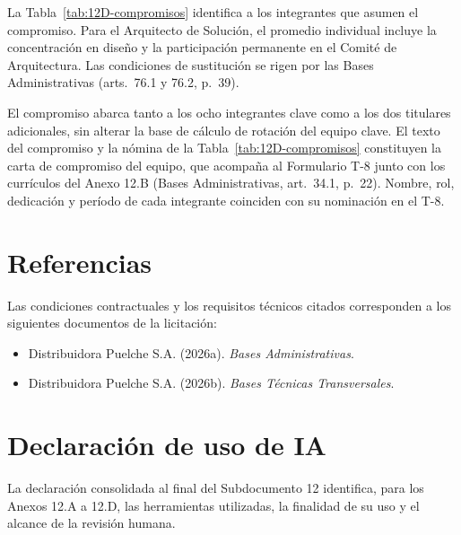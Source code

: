 La Tabla~\ref{tab:12D-compromisos} identifica a los integrantes que asumen el compromiso. Para el Arquitecto de Solución, el promedio individual incluye la concentración en diseño y la participación permanente en el Comité de Arquitectura. Las condiciones de sustitución se rigen por las Bases Administrativas (arts.~76.1 y 76.2, p.~39).


El compromiso abarca tanto a los ocho integrantes clave como a los dos titulares adicionales, sin alterar la base de cálculo de rotación del equipo clave. El texto del compromiso y la nómina de la Tabla~\ref{tab:12D-compromisos} constituyen la carta de compromiso del equipo, que acompaña al Formulario T-8 junto con los currículos del Anexo 12.B (Bases Administrativas, art.~34.1, p.~22). Nombre, rol, dedicación y período de cada integrante coinciden con su nominación en el T-8.

\section*{Referencias}
{}

Las condiciones contractuales y los requisitos técnicos citados corresponden a los siguientes documentos de la licitación:

\begin{itemize}
\item Distribuidora Puelche S.A. (2026a). \emph{Bases Administrativas}.
\item Distribuidora Puelche S.A. (2026b). \emph{Bases Técnicas Transversales}.
\end{itemize}

\section*{Declaración de uso de IA}
{}

La declaración consolidada al final del Subdocumento 12 identifica, para los Anexos 12.A a 12.D, las herramientas utilizadas, la finalidad de su uso y el alcance de la revisión humana.
